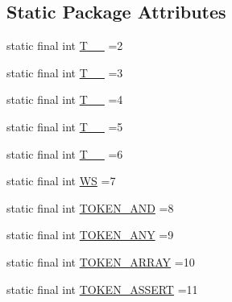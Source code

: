 \subsection*{Static Package Attributes}
\begin{DoxyCompactItemize}
\item 
static final int \hyperlink{classgov_1_1nasa_1_1jpf_1_1inspector_1_1server_1_1expression_1_1parser_1_1_expression_grammar_parser_aa7abaea5c810058ee748969dff385b9e}{T\+\_\+\+\_} =2
\item 
static final int \hyperlink{classgov_1_1nasa_1_1jpf_1_1inspector_1_1server_1_1expression_1_1parser_1_1_expression_grammar_parser_afad4c6ad364a1969b2f65bf00345f6bf}{T\+\_\+\+\_} =3
\item 
static final int \hyperlink{classgov_1_1nasa_1_1jpf_1_1inspector_1_1server_1_1expression_1_1parser_1_1_expression_grammar_parser_a68f9589dcc3fc777455467ff010385ea}{T\+\_\+\+\_} =4
\item 
static final int \hyperlink{classgov_1_1nasa_1_1jpf_1_1inspector_1_1server_1_1expression_1_1parser_1_1_expression_grammar_parser_ae620c05745b7d42e86cfe3f8113e22d2}{T\+\_\+\+\_} =5
\item 
static final int \hyperlink{classgov_1_1nasa_1_1jpf_1_1inspector_1_1server_1_1expression_1_1parser_1_1_expression_grammar_parser_a654bdd247ff16fb12ae977544fcc4bde}{T\+\_\+\+\_} =6
\item 
static final int \hyperlink{classgov_1_1nasa_1_1jpf_1_1inspector_1_1server_1_1expression_1_1parser_1_1_expression_grammar_parser_ace44714ae633c7b14794cc5a24d9ebf3}{WS} =7
\item 
static final int \hyperlink{classgov_1_1nasa_1_1jpf_1_1inspector_1_1server_1_1expression_1_1parser_1_1_expression_grammar_parser_a331667ae98e64b4bcdd3b866e7e2cd64}{T\+O\+K\+E\+N\+\_\+\+A\+ND} =8
\item 
static final int \hyperlink{classgov_1_1nasa_1_1jpf_1_1inspector_1_1server_1_1expression_1_1parser_1_1_expression_grammar_parser_a21f8df7c638568302922694eab614972}{T\+O\+K\+E\+N\+\_\+\+A\+NY} =9
\item 
static final int \hyperlink{classgov_1_1nasa_1_1jpf_1_1inspector_1_1server_1_1expression_1_1parser_1_1_expression_grammar_parser_a5245a46acb46b8f00f1e7ef7d32101ea}{T\+O\+K\+E\+N\+\_\+\+A\+R\+R\+AY} =10
\item 
static final int \hyperlink{classgov_1_1nasa_1_1jpf_1_1inspector_1_1server_1_1expression_1_1parser_1_1_expression_grammar_parser_a5965ddc9ea8411ed43e28f73def173d2}{T\+O\+K\+E\+N\+\_\+\+A\+S\+S\+E\+RT} =11

\end{DoxyCompactItemize}
